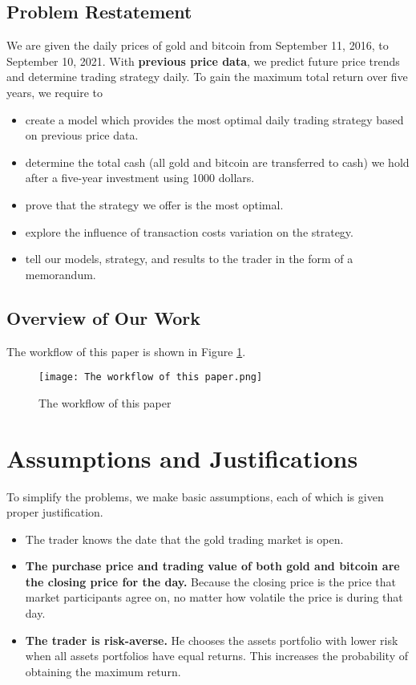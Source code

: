 \documentclass[12pt]{article}
\begin{document}
\subsection{Problem Restatement}
We are given the daily prices of gold and bitcoin from September 11, 2016, to September 10, 2021. With \textbf{previous price data}, we predict future price trends and determine trading strategy daily. To gain the maximum total return over five years, we require to 
\begin{itemize}
\item create a model which provides the most optimal daily trading strategy based on previous price data.
\item determine the total cash (all gold and bitcoin are transferred to cash) we hold after a five-year investment using 1000 dollars.
\item prove that the strategy we offer is the most optimal.
\item explore the influence of transaction costs variation on the strategy.
\item tell our models, strategy, and results to the trader in the form of a memorandum.
\end{itemize}

\subsection{Overview of Our Work}
The workflow of this paper is shown in Figure \ref{F11}.
\begin{figure}[htb]
 \centering
 \texttt{[image: The workflow of this paper.png]}
 \caption{The workflow of this paper}
 \label{F11} %
\end{figure}

\section{Assumptions and Justifications}
To simplify the problems, we make basic assumptions, each of which is given proper justification.
\begin{itemize}
\item The trader knows the date that the gold trading market is open.
\item \textbf{The purchase price and trading value of both gold and bitcoin are the closing price for the day.} Because the closing price is the price that market participants agree on, no matter how volatile the price is during that day.
\item \textbf{The trader is risk-averse.} He chooses the assets portfolio with lower risk when all assets portfolios have equal returns. This increases the probability of obtaining the maximum return.
\end{itemize}
\end{document}
